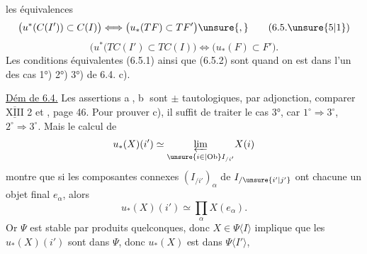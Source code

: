 les équivalences
\[
\bigl(u^*(C(I'))\subset C(I)\bigr)\Longleftrightarrow
\bigl(u_*(TF)\subset TF'\bigr)\unsure{,}
\tag*{(6.5.\unsure{5|1})}
\]
\[
\bigl(u^*(TC(I')\subset TC(I)\bigr)\Longleftrightarrow
\bigl(u_*(F)\subset F'\bigr).
\tag*{(6.5.2)}
\]
Les conditions équivalentes (6.5.1) ainsi que
(6.5.2) sont  quand on est
dans l'un des cas 1°) 2°) 3°) de
6.4. c).

\uline{Dém de 6.4.} Les assertions \textcircled{a}, \textcircled{b}
sont $\pm$ tautologiques, par adjonction,
comparer $\overline{\underline{\mathrm{XIII}}}$  2 et , page 46.
Pour prouver c), il suffit de traiter le
cas 3°, car  $1^\circ\Rightarrow3^\circ$, $2^\circ\Rightarrow3^\circ$.
Mais le calcul de 
\[
u_*(X)(i')\simeq\underset{\unsure{i\in|\mathrm{Ob}} I_{/i'}}{\underleftarrow{\lim}}X(i)
\]
montre que si les composantes
connexes $(I_{/i'})_\alpha$ de $I_{/\unsure{i'|j'}}$ ont
chacune un objet final $e_\alpha$, alors
\[
u_*(X)(i')\simeq\prod_\alpha X(e_\alpha).
\]
Or $\Psi$  est stable par produits quelconques,
donc $X\in\Psi\langle I\rangle$ implique que
 les $u_*(X)(i')$ sont dans $\Psi$, donc
$u_*(X)$ est dans $\Psi\langle I'\rangle$, 

